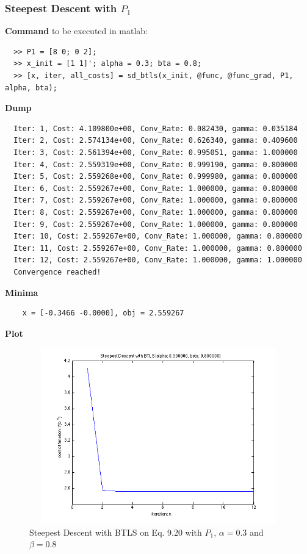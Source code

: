 \documentclass[11pt,a4paper]{article}
\begin{document}
\newpage
\subsubsection{Steepest Descent with $P_1$}
{\bf Command} to be executed in matlab:
\begin{verbatim}
  >> P1 = [8 0; 0 2];
  >> x_init = [1 1]'; alpha = 0.3; bta = 0.8;
  >> [x, iter, all_costs] = sd_btls(x_init, @func, @func_grad, P1, alpha, bta);
\end{verbatim}
{\bf Dump}
\begin{verbatim}
  Iter: 1, Cost: 4.109800e+00, Conv_Rate: 0.082430, gamma: 0.035184
  Iter: 2, Cost: 2.574134e+00, Conv_Rate: 0.626340, gamma: 0.409600
  Iter: 3, Cost: 2.561394e+00, Conv_Rate: 0.995051, gamma: 1.000000
  Iter: 4, Cost: 2.559319e+00, Conv_Rate: 0.999190, gamma: 0.800000
  Iter: 5, Cost: 2.559268e+00, Conv_Rate: 0.999980, gamma: 0.800000
  Iter: 6, Cost: 2.559267e+00, Conv_Rate: 1.000000, gamma: 0.800000
  Iter: 7, Cost: 2.559267e+00, Conv_Rate: 1.000000, gamma: 0.800000
  Iter: 8, Cost: 2.559267e+00, Conv_Rate: 1.000000, gamma: 0.800000
  Iter: 9, Cost: 2.559267e+00, Conv_Rate: 1.000000, gamma: 0.800000
  Iter: 10, Cost: 2.559267e+00, Conv_Rate: 1.000000, gamma: 0.800000
  Iter: 11, Cost: 2.559267e+00, Conv_Rate: 1.000000, gamma: 0.800000
  Iter: 12, Cost: 2.559267e+00, Conv_Rate: 1.000000, gamma: 1.000000
  Convergence reached!
\end{verbatim}
{\bf Minima}
\begin{verbatim}
    x = [-0.3466 -0.0000], obj = 2.559267 
   \end{verbatim}
{\bf Plot}
\begin{figure}[h]
    \centering
    \includegraphics[width=5in,height=3in]{../ps2_matlab/2.png}
    \caption{Steepest Descent with BTLS on
        Eq. 9.20 with $P_1$, $\alpha = 0.3$ and $\beta = 0.8$}
\end{figure}
\end{document}
